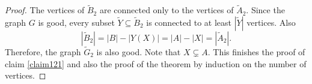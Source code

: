 \begin{proof}
The vertices of $\tilde{B}_{2}$ are connected only to the vertices of $\tilde{A}_{2}$. Since the graph $G$ is good, every subset $\tilde{Y}\subseteq \tilde{B}_{2}$ is connected to at least $|\tilde{Y}|$ vertices. Also 
$$
|\tilde{B}_{2}|=|B|-|Y(X)|=|A|-|X|=|\tilde{A}_{2}|.
$$
Therefore, the graph $\tilde{G}_{2}$ is also good. Note that $X\subsetneq A$. This finishes the proof of claim \ref{claim121} and also the proof of the theorem by induction on the number of vertices.
\end{proof}